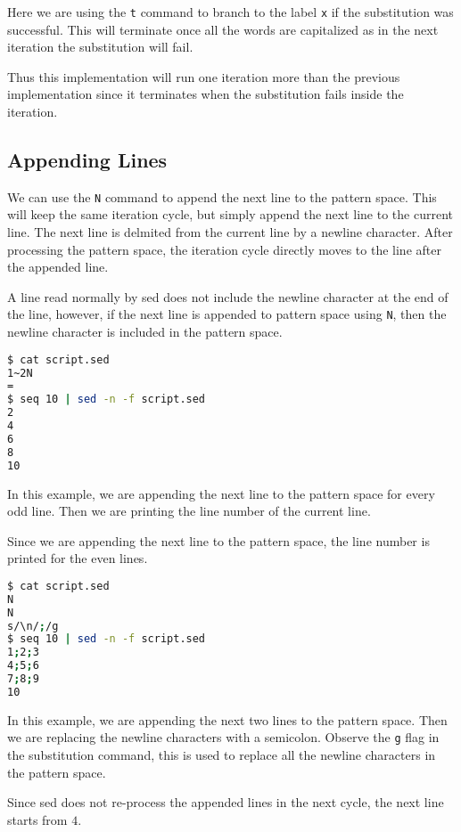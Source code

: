 Here we are using the \lstinline|t| command to branch to the label \lstinline|x| if the substitution was successful.
This will terminate once all the words are capitalized as in the next iteration the substitution will fail.

Thus this implementation will run one iteration more than the previous implementation since it terminates when the substitution fails inside the iteration.

\subsection{Appending Lines}

We can use the \lstinline|N| command to append the next line to the pattern space.
This will keep the same iteration cycle, but simply append the next line to the current line.
The next line is delmited from the current line by a newline character.
After processing the pattern space, the iteration cycle directly moves to the line after the appended line.

A line read normally by sed does not include the newline character at the end of the line, however, if the next line is appended to pattern space using
\lstinline|N|, then the newline character is included in the pattern space.

\begin{lstlisting}[language=bash]
$ cat script.sed
1~2N
=
$ seq 10 | sed -n -f script.sed
2
4
6
8
10
\end{lstlisting}

In this example, we are appending the next line to the pattern space for every odd line.
Then we are printing the line number of the current line.

Since we are appending the next line to the pattern space, the line number is printed for the even lines.

\begin{lstlisting}[language=bash]
$ cat script.sed
N
N
s/\n/;/g
$ seq 10 | sed -n -f script.sed
1;2;3
4;5;6
7;8;9
10
\end{lstlisting}

In this example, we are appending the next two lines to the pattern space.
Then we are replacing the newline characters with a semicolon.
Observe the \lstinline|g| flag in the substitution command, this is used to replace all the newline characters in the pattern space.

Since sed does not re-process the appended lines in the next cycle, the next line starts from $4$.

